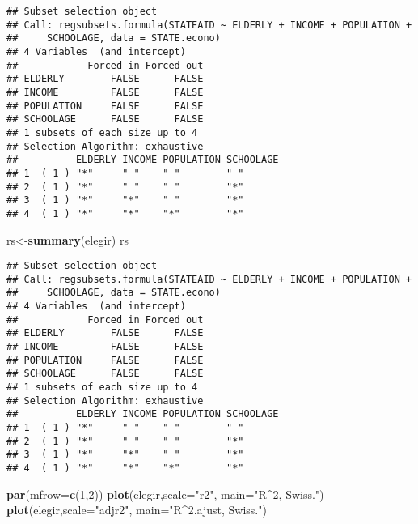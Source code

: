 \documentclass[
]{article}
\newenvironment{Shaded}{\begin{snugshade}}{\end{snugshade}}
\newcommand{\DataTypeTok}[1]{\textcolor[rgb]{0.13,0.29,0.53}{#1}}
\newcommand{\DecValTok}[1]{\textcolor[rgb]{0.00,0.00,0.81}{#1}}
\newcommand{\KeywordTok}[1]{\textcolor[rgb]{0.13,0.29,0.53}{\textbf{#1}}}
\newcommand{\NormalTok}[1]{#1}
\newcommand{\StringTok}[1]{\textcolor[rgb]{0.31,0.60,0.02}{#1}}
\begin{document}
\begin{verbatim}
## Subset selection object
## Call: regsubsets.formula(STATEAID ~ ELDERLY + INCOME + POPULATION + 
##     SCHOOLAGE, data = STATE.econo)
## 4 Variables  (and intercept)
##            Forced in Forced out
## ELDERLY        FALSE      FALSE
## INCOME         FALSE      FALSE
## POPULATION     FALSE      FALSE
## SCHOOLAGE      FALSE      FALSE
## 1 subsets of each size up to 4
## Selection Algorithm: exhaustive
##          ELDERLY INCOME POPULATION SCHOOLAGE
## 1  ( 1 ) "*"     " "    " "        " "      
## 2  ( 1 ) "*"     " "    " "        "*"      
## 3  ( 1 ) "*"     "*"    " "        "*"      
## 4  ( 1 ) "*"     "*"    "*"        "*"
\end{verbatim}

\begin{Shaded}
\begin{Highlighting}[]
\NormalTok{rs<-}\KeywordTok{summary}\NormalTok{(elegir)}
\NormalTok{rs}
\end{Highlighting}
\end{Shaded}

\begin{verbatim}
## Subset selection object
## Call: regsubsets.formula(STATEAID ~ ELDERLY + INCOME + POPULATION + 
##     SCHOOLAGE, data = STATE.econo)
## 4 Variables  (and intercept)
##            Forced in Forced out
## ELDERLY        FALSE      FALSE
## INCOME         FALSE      FALSE
## POPULATION     FALSE      FALSE
## SCHOOLAGE      FALSE      FALSE
## 1 subsets of each size up to 4
## Selection Algorithm: exhaustive
##          ELDERLY INCOME POPULATION SCHOOLAGE
## 1  ( 1 ) "*"     " "    " "        " "      
## 2  ( 1 ) "*"     " "    " "        "*"      
## 3  ( 1 ) "*"     "*"    " "        "*"      
## 4  ( 1 ) "*"     "*"    "*"        "*"
\end{verbatim}

\begin{Shaded}
\begin{Highlighting}[]
\KeywordTok{par}\NormalTok{(}\DataTypeTok{mfrow=}\KeywordTok{c}\NormalTok{(}\DecValTok{1}\NormalTok{,}\DecValTok{2}\NormalTok{))}
\KeywordTok{plot}\NormalTok{(elegir,}\DataTypeTok{scale=}\StringTok{"r2"}\NormalTok{, }\DataTypeTok{main=}\StringTok{"R^2, Swiss."}\NormalTok{)}
\KeywordTok{plot}\NormalTok{(elegir,}\DataTypeTok{scale=}\StringTok{"adjr2"}\NormalTok{, }\DataTypeTok{main=}\StringTok{"R^2.ajust, Swiss."}\NormalTok{)}
\end{Highlighting}
\end{Shaded}
\end{document}
